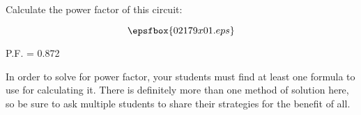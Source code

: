 

Calculate the power factor of this circuit:

$$\epsfbox{02179x01.eps}$$







P.F. = 0.872







In order to solve for power factor, your students must find at least one formula to use for calculating it.  There is definitely more than one method of solution here, so be sure to ask multiple students to share their strategies for the benefit of all.




